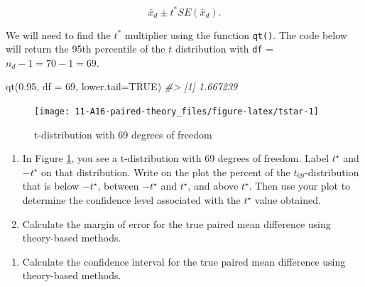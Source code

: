 \documentclass[
]{report}
\newenvironment{Shaded}{\begin{snugshade}}{\end{snugshade}}
\newcommand{\AttributeTok}[1]{\textcolor[rgb]{0.77,0.63,0.00}{#1}}
\newcommand{\CommentTok}[1]{\textcolor[rgb]{0.56,0.35,0.01}{\textit{#1}}}
\newcommand{\ConstantTok}[1]{\textcolor[rgb]{0.00,0.00,0.00}{#1}}
\newcommand{\DecValTok}[1]{\textcolor[rgb]{0.00,0.00,0.81}{#1}}
\newcommand{\FloatTok}[1]{\textcolor[rgb]{0.00,0.00,0.81}{#1}}
\newcommand{\FunctionTok}[1]{\textcolor[rgb]{0.00,0.00,0.00}{#1}}
\newcommand{\NormalTok}[1]{#1}
\providecommand{\tightlist}{%
  \setlength{\itemsep}{0pt}\setlength{\parskip}{0pt}}
\begin{document}
\[\bar{x}_d\pm t^* SE(\bar{x}_d).\]

We will need to find the \(t^*\) multiplier using the function \texttt{qt()}. The code below will return the 95th percentile of the \(t\) distribution with \texttt{df} = \(n_d - 1 = 70 - 1 = 69\).

\begin{Shaded}
\begin{Highlighting}[]
\FunctionTok{qt}\NormalTok{(}\FloatTok{0.95}\NormalTok{, }\AttributeTok{df =} \DecValTok{69}\NormalTok{, }\AttributeTok{lower.tail=}\ConstantTok{TRUE}\NormalTok{)}
\CommentTok{\#\textgreater{} [1] 1.667239}
\end{Highlighting}
\end{Shaded}

\begin{figure}

{\centering \texttt{[image: 11-A16-paired-theory\_files/figure-latex/tstar-1]} 

}

\caption{t-distribution with 69 degrees of freedom}\label{fig:tstar}
\end{figure}
\newpage

\begin{enumerate}
\def\labelenumi{\arabic{enumi}.}
\setcounter{enumi}{10}
\item
  In Figure \ref{fig:tstar}, you see a t-distribution with 69 degrees of freedom. Label \(t^\star\) and \(-t^\star\) on that distribution. Write on the plot the percent of the \(t_{69}\)-distribution that is below \(-t^\star\), between \(-t^\star\) and \(t^\star\), and above \(t^\star\). Then use your plot to determine the confidence level associated with the \(t^\star\) value obtained.
  \vspace{0.3in}
\item
  Calculate the margin of error for the true paired mean difference using theory-based methods.
\end{enumerate}

\vspace{0.6in}

\begin{enumerate}
\def\labelenumi{\arabic{enumi}.}
\setcounter{enumi}{12}
\tightlist
\item
  Calculate the confidence interval for the true paired mean difference using theory-based methods.
\end{enumerate}

\vspace{0.6in}
\end{document}
